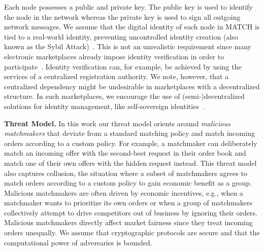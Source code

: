 Each node possesses a public and private key.
The public key is used to identify the node in the network whereas the private key is used to sign all outgoing network messages.
We assume that the digital identity of each node in MATCH is tied to a real-world identity, preventing uncontrolled identity creation (also known as the Sybil Attack)~\cite{douceur2002sybil}.
This is not an unrealistic requirement since many electronic marketplaces already impose identity verification in order to participate~\cite{damiani2003managing}.
Identity verification can, for example, be achieved by using the services of a centralized registration authority.
We note, however, that a centralized dependency might be undesirable in marketplaces with a decentralized structure.
In such marketplaces, we encourage the use of (semi-)decentralized solutions for identity management, like self-sovereign identities~\cite{muhle2018survey,stokkink2020truly}.

\textbf{Threat Model.}
In this work our threat model orients around \emph{malicious matchmakers} that deviate from a standard matching policy and match incoming orders according to a custom policy.
For example, a matchmaker can deliberately match an incoming offer with the second-best request in their order book and match one of their own offers with the hidden request instead.
This threat model also captures collusion, the situation where a subset of matchmakers agrees to match orders according to a custom policy to gain economic benefit as a group.
Malicious matchmakers are often driven by economic incentives, e.g., when a matchmaker wants to prioritize its own orders or when a group of matchmakers collectively attempt to drive competitors out of business by ignoring their orders.
Malicious matchmakers directly affect market fairness since they treat incoming orders unequally.
We assume that cryptographic protocols are secure and that the computational power of adversaries is bounded.

